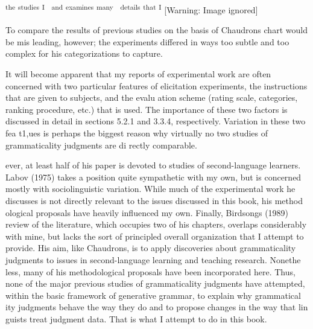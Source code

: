 \begin{styleStandard}
\textsuperscript{the}\textsuperscript{ }\textsuperscript{studies}\textsuperscript{ }\textsuperscript{I\ \ and}\textsuperscript{ }\textsuperscript{examines}\textsuperscript{ }\textsuperscript{many\ \ details}\textsuperscript{ }\textsuperscript{that}\textsuperscript{ }\textsuperscript{I}\textsuperscript{ }  [Warning: Image ignored] %
 
\end{styleStandard}


\begin{listWWNumlxixleveli}
\item 
\begin{styleStandard}
To compare the results of previous studies on the basis of Chaudron{\textquotesingle}s chart would be mis\- leading, however; the experiments differed in ways too subtle and too complex for his categorizations to capture.
\end{styleStandard}


\item 
\begin{styleStandard}
It will become apparent that my reports of experimental work are often concerned with two particular features of elicitation experiments, the instructions that are given to subjects, and the evalu\- ation scheme (rating scale, categories, ranking procedure, etc.) that is used. The importance of these two factors is discussed in detail in sections 5.2.1 and 3.3.4, respectively. Variation in these two fea\- t1,ues is perhaps the biggest reason why virtually no two studies of grammaticality judgments are di\- rectly comparable.
\end{styleStandard}


\end{listWWNumlxixleveli}
\clearpage\setcounter{page}{1}\begin{styleTextbody}
ever, at least half of his paper is devoted to studies of second-language learners. Labov (1975) takes a position quite sympathetic with my own, but is concerned mostly with sociolinguistic variation. While much of the experimental work he discusses is not directly relevant to the issues discussed in this book, his method\- ological proposals have heavily influenced my own. Finally, Birdsong{\textquotesingle}s (1989) review of the literature, which occupies two of his chapters, overlaps considerably with mine, but lacks the sort of principled overall organization that I attempt to provide. His aim, like Chaudron{\textquotesingle}s, is to apply discoveries about grammaticality judgments to issues in second-language learning and teaching research. Nonethe\- less, many of his methodological proposals have been incorporated here. Thus, none of the major previous studies of grammaticality judgments have attempted, within the basic framework of generative grammar, to explain why grammatical\- ity judgments behave the way they do and to propose changes in the way that lin\- guists treat judgment data. That is what I attempt to do in this book.
\end{styleTextbody}


